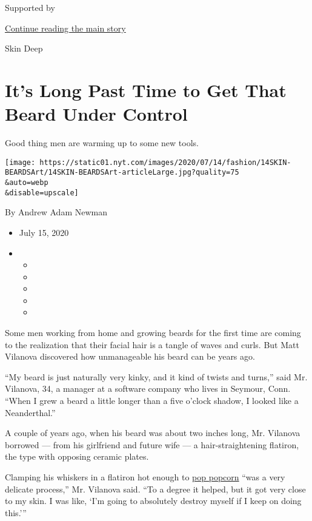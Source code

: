 Supported by

\protect\hyperlink{after-sponsor}{Continue reading the main story}

Skin Deep

\hypertarget{its-long-past-time-to-get-that-beard-under-control}{%
\section{It's Long Past Time to Get That Beard Under
Control}\label{its-long-past-time-to-get-that-beard-under-control}}

Good thing men are warming up to some new tools.

\texttt{[image: https://static01.nyt.com/images/2020/07/14/fashion/14SKIN-BEARDSArt/14SKIN-BEARDSArt-articleLarge.jpg?quality=75\\\&auto=webp\\\&disable=upscale]}

By Andrew Adam Newman

\begin{itemize}
\item
  July 15, 2020
\item
  \begin{itemize}
  \item
  \item
  \item
  \item
  \item
  \end{itemize}
\end{itemize}

Some men working from home and growing beards for the first time are
coming to the realization that their facial hair is a tangle of waves
and curls. But Matt Vilanova discovered how unmanageable his beard can
be years ago.

``My beard is just naturally very kinky, and it kind of twists and
turns,'' said Mr. Vilanova, 34, a manager at a software company who
lives in Seymour, Conn. ``When I grew a beard a little longer than a
five o'clock shadow, I looked like a Neanderthal.''

A couple of years ago, when his beard was about two inches long, Mr.
Vilanova borrowed --- from his girlfriend and future wife --- a
hair-straightening flatiron, the type with opposing ceramic plates.

Clamping his whiskers in a flatiron hot enough to
\href{https://www.youtube.com/watch?v=IhLEzuH3L40}{pop popcorn} ``was a
very delicate process,'' Mr. Vilanova said. ``To a degree it helped, but
it got very close to my skin. I was like, `I'm going to absolutely
destroy myself if I keep on doing this.'''

